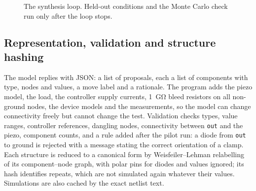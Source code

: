 \documentclass[journal]{IEEEtran}
\begin{document}
\begin{figure}[t]
\centering
{}
\caption{The synthesis loop. Held-out conditions and the Monte Carlo check run only after the loop stops.}
\label{fig:flow}
\end{figure}

\subsection{Representation, validation and structure hashing}
The model replies with JSON: a list of proposals, each a list of components with type, nodes and
values, a move label and a rationale. The program adds the piezo model, the load, the controller supply
currents, \SI{1}{\giga\ohm} bleed resistors on all non-ground nodes, the device models and the
measurements, so the model can change connectivity freely but cannot change the test. Validation checks
types, value ranges, controller references, dangling nodes, connectivity between \texttt{out} and the
piezo, component counts, and a rule added after the pilot run: a diode from \texttt{out} to ground is
rejected with a message stating the correct orientation of a clamp. Each structure is reduced to a
canonical form by Weisfeiler--Lehman relabelling~\cite{shervashidze2011wl} of its component--node graph,
with polar pins for diodes and values ignored; its hash identifies repeats, which are not simulated
again whatever their values. Simulations are also cached by the exact netlist text.
\end{document}

